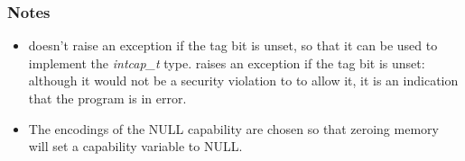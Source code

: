 \subsubsection*{Notes}

\begin{itemize}
\item
{} doesn't raise an exception if the tag bit is unset,
so that it can be used to implement the \emph{intcap\_t} type.
 raises an exception if the tag bit is unset: although
it would not be a security violation to to allow it, it is an indication
that the program is in error.
\item
The encodings of the NULL capability are chosen so that zeroing memory will
set a capability variable to NULL.
\end{itemize}
